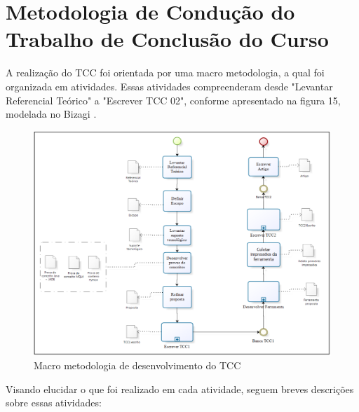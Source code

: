 \section{Metodologia de Condução do Trabalho de Conclusão do Curso}

A realização do TCC foi orientada por uma macro metodologia, a qual foi organizada em atividades.
Essas atividades compreenderam desde "Levantar Referencial Teórico" a "Escrever TCC 02", conforme apresentado na figura 15, modelada no Bizagi \textcopyright.
\begin{figure}[h!]
\centering
\label{f11}
\includegraphics[width=1\textwidth]{figuras/f27}
\caption{Macro metodologia de desenvolvimento do TCC}
\end{figure}
\FloatBarrier

Visando elucidar o que foi realizado em cada atividade, seguem breves descrições sobre essas atividades:

